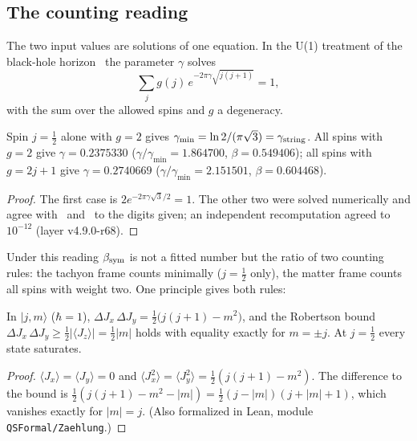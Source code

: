 \subsection{The counting reading}

The two input values are solutions of one equation.  In the U(1) treatment of the black-hole horizon~\cite{abck,domagala,meissner}
the parameter \(\gamma\) solves
\[
\sum_j g(j)\,e^{-2\pi\gamma\sqrt{j(j+1)}}=1,
\]
with the sum over the allowed spins and \(g\) a degeneracy.

\begin{proposition}[Countings]\label{prop:countings}
Spin \(j=\tfrac12\) alone with \(g=2\) gives \(\gamma_{\min}=\ln2/(\pi\sqrt3)=\gamma_{\rm string}\).  All spins with \(g=2\) give
\(\gamma=0.2375330\) (\(\gamma/\gamma_{\min}=1.864700\), \(\beta=0.549406\)); all spins with \(g=2j+1\) give \(\gamma=0.2740669\)
(\(\gamma/\gamma_{\min}=2.151501\), \(\beta=0.604468\)).
\end{proposition}

\begin{proof}
The first case is \(2e^{-2\pi\gamma\sqrt3/2}=1\).  The other two were solved numerically and agree with~\cite{meissner} and~\cite{ghosh}
to the digits given; an independent recomputation agreed to \(10^{-12}\) (layer v4.9.0-r68).
\end{proof}

Under this reading \(\beta_{\rm sym}\) is not a fitted number but the ratio of two counting rules: the tachyon frame counts minimally
(\(j=\tfrac12\) only), the matter frame counts all spins with weight two.  One principle gives both rules:

\begin{proposition}\label{prop:robertson}
In \(|j,m\rangle\) (\(\hbar=1\)), \(\Delta J_x\,\Delta J_y=\tfrac12\bigl(j(j+1)-m^2\bigr)\), and the Robertson bound
\(\Delta J_x\,\Delta J_y\ge\tfrac12|\langle J_z\rangle|=\tfrac12|m|\) holds with equality exactly for \(m=\pm j\).  At \(j=\tfrac12\) every state
saturates.
\end{proposition}

\begin{proof}
\(\langle J_x\rangle=\langle J_y\rangle=0\) and \(\langle J_x^2\rangle=\langle J_y^2\rangle=\tfrac12(j(j+1)-m^2)\).  The difference to the bound is
\(\tfrac12(j(j+1)-m^2-|m|)=\tfrac12(j-|m|)(j+|m|+1)\), which vanishes exactly for \(|m|=j\).  (Also formalized in Lean, module
\texttt{QSFormal/Zaehlung}.)
\end{proof}

